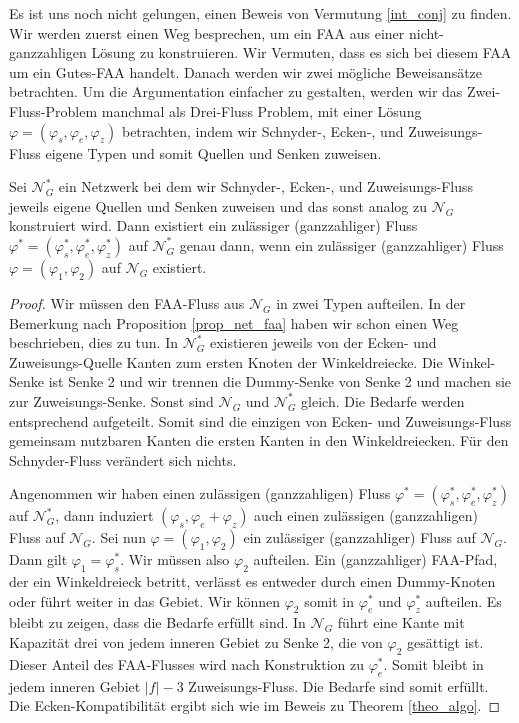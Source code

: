 Es ist uns noch nicht gelungen, einen Beweis von Vermutung \ref{int_conj} zu finden. Wir werden zuerst einen Weg besprechen, um ein FAA aus einer nicht-ganzzahligen Lösung zu konstruieren. Wir Vermuten, dass es sich bei diesem FAA um ein Gutes-FAA handelt. Danach werden wir zwei mögliche Beweisansätze betrachten. Um die Argumentation einfacher zu gestalten, werden wir das Zwei-Fluss-Problem manchmal als Drei-Fluss Problem, mit einer Lösung $\varphi=(\varphi_s,\varphi_e,\varphi_z)$ betrachten, indem wir Schnyder-, Ecken-, und Zuweisungs-Fluss eigene Typen und somit Quellen und Senken zuweisen.

\begin{proposition}
Sei $\mathcal{N}^*_G$ ein Netzwerk bei dem wir Schnyder-, Ecken-, und Zuweisungs-Fluss jeweils eigene Quellen und Senken zuweisen und das sonst analog zu $\mathcal{N}_G$ konstruiert wird. Dann existiert ein zulässiger (ganzzahliger) Fluss $\varphi^*=(\varphi^*_s,\varphi^*_e,\varphi^*_z)$ auf $\mathcal{N}^*_G$ genau dann, wenn ein zulässiger (ganzzahliger) Fluss $\varphi=(\varphi_1,\varphi_2)$ auf 
$\mathcal{N}_G$ existiert.
\end{proposition}

\begin{proof}
Wir müssen den FAA-Fluss aus $\mathcal{N}_G$ in zwei Typen aufteilen. In der Bemerkung nach Proposition \ref{prop_net_faa} haben wir schon einen Weg beschrieben, dies zu tun. In $\mathcal{N}_G^*$ existieren jeweils von der Ecken- und Zuweisungs-Quelle Kanten zum ersten Knoten der Winkeldreiecke. Die Winkel-Senke ist Senke 2 und wir trennen die Dummy-Senke von Senke 2 und machen sie zur Zuweisungs-Senke. Sonst sind $\mathcal{N}_G$ und $\mathcal{N}^*_G$ gleich. Die Bedarfe werden entsprechend aufgeteilt. Somit sind die einzigen von Ecken- und Zuweisungs-Fluss gemeinsam nutzbaren Kanten die ersten Kanten in den Winkeldreiecken. Für den Schnyder-Fluss verändert sich nichts.

Angenommen wir haben einen zulässigen (ganzzahligen) Fluss $\varphi^*=(\varphi^*_s,\varphi^*_e,\varphi^*_z)$ auf $\mathcal{N}_G^*$, dann induziert $(\varphi_s,\varphi_e+\varphi_z)$ auch einen zulässigen (ganzzahligen) Fluss auf $\mathcal{N}_G$. Sei nun $\varphi=(\varphi_1,\varphi_2)$ ein zulässiger (ganzzahliger) Fluss auf $\mathcal{N}_G$. Dann gilt $\varphi_1 = \varphi^*_s$. Wir müssen also $\varphi_2$ aufteilen. Ein (ganzzahliger) FAA-Pfad, der ein Winkeldreieck betritt, verlässt es entweder durch einen Dummy-Knoten oder führt weiter in das Gebiet. Wir können $\varphi_2$ somit in $\varphi_e^*$ und $\varphi_z^*$ aufteilen. Es bleibt zu zeigen, dass die Bedarfe erfüllt sind. In $\mathcal{N}_G$ führt eine Kante mit Kapazität drei von jedem inneren Gebiet zu Senke 2, die von $\varphi_2$ gesättigt ist. Dieser Anteil des FAA-Flusses wird nach Konstruktion zu $\varphi_e^*$. Somit bleibt in jedem inneren Gebiet $|f|-3$ Zuweisungs-Fluss. Die Bedarfe sind somit erfüllt. Die Ecken-Kompatibilität ergibt sich wie im Beweis zu Theorem \ref{theo_algo}.
\end{proof}

